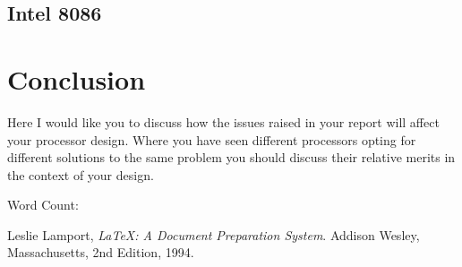 \documentclass[12pt,a4paper]{article}
\begin{document}
\subsection{Intel 8086}

\section{Conclusion}
Here I would like you to discuss how the issues raised in your report will affect your processor design. Where you have seen different processors opting for different solutions to the same problem you should discuss their relative merits in the context of your design. 

Word Count: %



\renewcommand{\refname}{Bibliography}
\begin{thebibliography}{9}

  Leslie Lamport,
  \emph{\LaTeX: A Document Preparation System}.
  Addison Wesley, Massachusetts,
  2nd Edition,
  1994.

\end{thebibliography}
\end{document}

